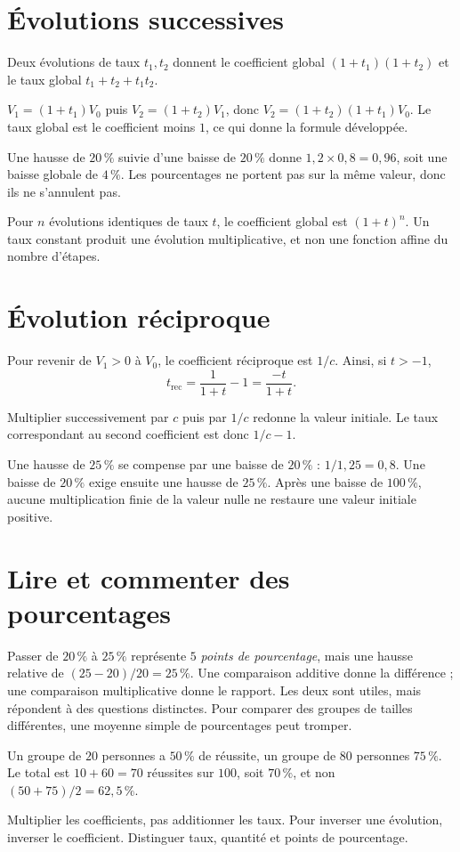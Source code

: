 \documentclass[../cours_2de.tex]{subfiles}
\begin{document}
\section{Évolutions successives}
\begin{propriete}
Deux évolutions de taux $t_1,t_2$ donnent le coefficient global
$(1+t_1)(1+t_2)$ et le taux global
$t_1+t_2+t_1t_2$.
\end{propriete}
\begin{demonstration}
$V_1=(1+t_1)V_0$ puis $V_2=(1+t_2)V_1$, donc
$V_2=(1+t_2)(1+t_1)V_0$.
Le taux global est le coefficient moins $1$, ce qui donne la formule développée.
\end{demonstration}
\begin{exemple}
Une hausse de $20\,\%$ suivie d'une baisse de $20\,\%$ donne
$1{,}2\times0{,}8=0{,}96$, soit une baisse globale de $4\,\%$.
Les pourcentages ne portent pas sur la même valeur, donc ils ne s'annulent pas.
\end{exemple}
Pour $n$ évolutions identiques de taux $t$, le coefficient global est $(1+t)^n$.
Un taux constant produit une évolution multiplicative, et non une fonction affine du nombre d'étapes.
\section{Évolution réciproque}
Pour revenir de $V_1>0$ à $V_0$, le coefficient réciproque est $1/c$.
Ainsi, si $t>-1$,
\[
t_{\mathrm{rec}}=\frac1{1+t}-1=\frac{-t}{1+t}.
\]
\begin{demonstration}
Multiplier successivement par $c$ puis par $1/c$ redonne la valeur initiale.
Le taux correspondant au second coefficient est donc $1/c-1$.
\end{demonstration}
Une hausse de $25\,\%$ se compense par une baisse de $20\,\%$ : $1/1{,}25=0{,}8$.
Une baisse de $20\,\%$ exige ensuite une hausse de $25\,\%$.
Après une baisse de $100\,\%$, aucune multiplication finie de la valeur nulle ne restaure une valeur initiale positive.
\section{Lire et commenter des pourcentages}
Passer de $20\,\%$ à $25\,\%$ représente $5$ \emph{points de pourcentage}, mais une hausse relative de $(25-20)/20=25\,\%$.
Une comparaison additive donne la différence ; une comparaison multiplicative donne le rapport. Les deux sont utiles, mais répondent à des questions distinctes.
Pour comparer des groupes de tailles différentes, une moyenne simple de pourcentages peut tromper.
\begin{exemple}
Un groupe de $20$ personnes a $50\,\%$ de réussite, un groupe de $80$ personnes $75\,\%$.
Le total est $10+60=70$ réussites sur $100$, soit $70\,\%$, et non $(50+75)/2=62{,}5\,\%$.
\end{exemple}
\begin{retenir}
Multiplier les coefficients, pas additionner les taux. Pour inverser une évolution, inverser le coefficient. Distinguer taux, quantité et points de pourcentage.
\end{retenir}
\end{document}
